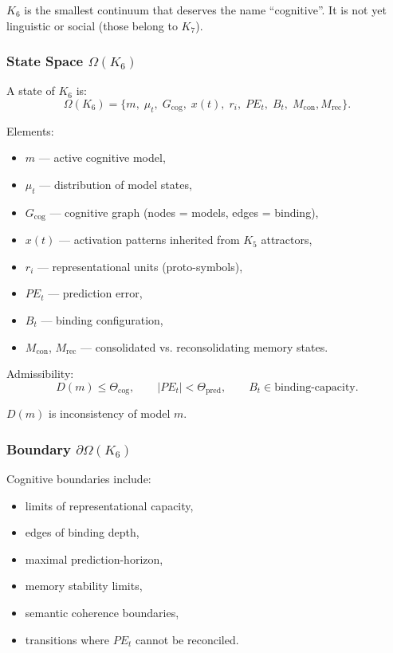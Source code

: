 $K_6$ is the smallest continuum that deserves the name ``cognitive''. It
is not yet linguistic or social (those belong to $K_7$).

\subsubsection{State Space \texorpdfstring{$\Omega(K_6)$}{\Omega(K_6)}}

A state of $K_6$ is:
\[
\Omega(K_6) =
\{
m,\; \mu_t,\; G_{\mathrm{cog}},\;
x(t),\; r_i,\;
PE_t,\; B_t,\;
M_{\mathrm{con}}, M_{\mathrm{rec}}
\}.
\]

Elements:
\begin{itemize}
    \item $m$ — active cognitive model,
    \item $\mu_t$ — distribution of model states,
    \item $G_{\mathrm{cog}}$ — cognitive graph (nodes = models, edges = binding),
    \item $x(t)$ — activation patterns inherited from $K_5$ attractors,
    \item $r_i$ — representational units (proto-symbols),
    \item $PE_t$ — prediction error,
    \item $B_t$ — binding configuration,
    \item $M_{\mathrm{con}}$, $M_{\mathrm{rec}}$ — consolidated vs. reconsolidating memory states.
\end{itemize}

Admissibility:
\[
D(m) \le \Theta_{\mathrm{cog}}, \qquad
|PE_t| < \Theta_{\mathrm{pred}}, \qquad
B_t \in \text{binding-capacity}.
\]

$D(m)$ is inconsistency of model $m$.

\subsubsection{Boundary \texorpdfstring{$\partial\Omega(K_6)$}{\partial\Omega(K_6)}}

Cognitive boundaries include:
\begin{itemize}
    \item limits of representational capacity,
    \item edges of binding depth,
    \item maximal prediction-horizon,
    \item memory stability limits,
    \item semantic coherence boundaries,
    \item transitions where $PE_t$ cannot be reconciled.
\end{itemize}

